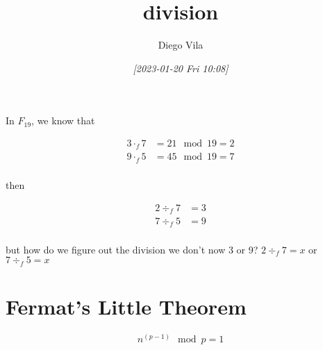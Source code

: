 \documentclass[11pt]{article}
\author{Diego Vila}
\date{\textit{[2023-01-20 Fri 10:08]}}
\title{division}
\begin{document}
\maketitle
\tableofcontents

In \(F_{19}\), we know that

\begin{align*}
3 \cdot_f 7 &= 21 \mod 19 = 2\\
9 \cdot_f 5 &= 45 \mod 19 = 7\\
\end{align*}

then

\begin{align*}
2 \div_f 7 &= 3\\
7 \div_f 5 &= 9\\
\end{align*}

but how do we figure out the division we don't now 3 or 9? \(2 \div_f 7 = x\) or \(7 \div_f 5 = x\)

\section{Fermat's Little Theorem}
\label{sec:org0f6f3b1}
\begin{equation*}
n^{(p-1)}\mod p = 1
\end{equation*}
\end{document}
